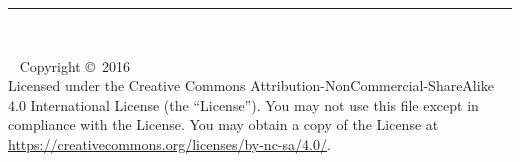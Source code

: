

\begin{titlepage}
	\flushright
	\hfill
	\vfill
	{\FANGSONG\LARGE\docTitle \par}
	\rule[5pt]{\textwidth}{.4pt} \par
	{\FANGSONG\Large\docAuthor}
	\vfill
	\textrm{\large\docDate} \\ 
\end{titlepage}

\newpage
~\vfill
\thispagestyle{empty}
\noindent Copyright \copyright\ 2016 \docAuthor \\
\noindent Licensed under the Creative Commons Attribution-NonCommercial-ShareAlike 4.0 International License (the ``License'').
You may not use this file except in compliance with the License. You may obtain a copy of the License at \url{https://creativecommons.org/licenses/by-nc-sa/4.0/}. \\ 
